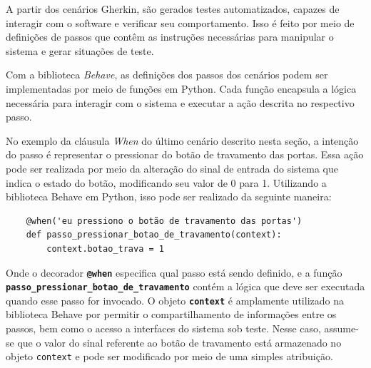 


A partir dos cenários Gherkin, são gerados testes automatizados, capazes de interagir com o software e verificar seu comportamento. Isso é feito por meio de definições de passos 
que contêm as instruções necessárias para manipular o sistema e gerar situações de teste.

Com a biblioteca \textit{Behave}, as definições dos passos dos cenários podem ser implementadas por meio de funções em Python. Cada função encapsula a lógica necessária para interagir 
com o sistema e executar a ação descrita no respectivo passo.




No exemplo da cláusula \textit{When} do último cenário descrito nesta seção, a intenção do passo é representar o pressionar do botão de travamento das portas. Essa ação pode 
ser realizada por meio da alteração do sinal de entrada do sistema que indica o estado do botão, modificando seu valor de 0 para 1. Utilizando a biblioteca Behave em 
Python, isso pode ser realizado da seguinte maneira:

\begin{verbatim}
	@when('eu pressiono o botão de travamento das portas')
	def passo_pressionar_botao_de_travamento(context):
		context.botao_trava = 1
\end{verbatim}

Onde o decorador \texttt{\textbf{@when}} especifica qual passo está sendo definido, e a função \texttt{\textbf{passo\_pressionar\_botao\_de\_travamento}} contém a lógica que
deve ser executada quando esse passo for invocado. O objeto \texttt{\textbf{context}} é amplamente utilizado na biblioteca Behave por permitir o compartilhamento de 
informações entre os passos, bem como o 
acesso a interfaces do sistema sob teste. Nesse caso, assume-se que o valor do sinal referente ao botão de travamento está armazenado no objeto \texttt{context} e pode ser 
modificado por meio de uma simples atribuição.

